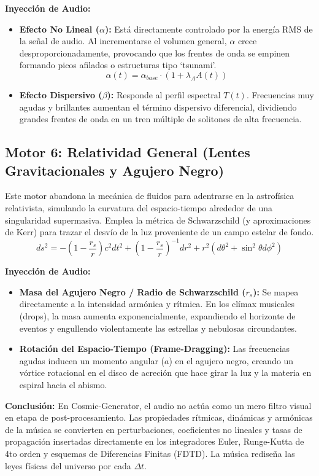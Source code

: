 \documentclass[12pt, openany]{book}
\begin{document}
\textbf{Inyección de Audio:}
\begin{itemize}
    \item \textbf{Efecto No Lineal ($\alpha$):} Está directamente controlado por la energía RMS de la señal de audio. Al incrementarse el volumen general, $\alpha$ crece desproporcionadamente, provocando que los frentes de onda se empinen formando picos afilados o estructuras tipo `tsunami'.
    $$\alpha(t) = \alpha_{base} \cdot (1 + \lambda_A A(t))$$
    \item \textbf{Efecto Dispersivo ($\beta$):} Responde al perfil espectral $T(t)$. Frecuencias muy agudas y brillantes aumentan el término dispersivo diferencial, dividiendo grandes frentes de onda en un tren múltiple de solitones de alta frecuencia.
\end{itemize}

\subsection{Motor 6: Relatividad General (Lentes Gravitacionales y Agujero Negro)}
Este motor abandona la mecánica de fluidos para adentrarse en la astrofísica relativista, simulando la curvatura del espacio-tiempo alrededor de una singularidad supermasiva. Emplea la métrica de Schwarzschild (y aproximaciones de Kerr) para trazar el desvío de la luz proveniente de un campo estelar de fondo.
\begin{equation}
ds^2 = -\left(1-\frac{r_s}{r}\right) c^2 dt^2 + \left(1-\frac{r_s}{r}\right)^{-1} dr^2 + r^2(d\theta^2 + \sin^2\theta d\phi^2)
\end{equation}

\textbf{Inyección de Audio:}
\begin{itemize}
    \item \textbf{Masa del Agujero Negro / Radio de Schwarzschild ($r_s$):} Se mapea directamente a la intensidad armónica y rítmica. En los clímax musicales (drops), la masa aumenta exponencialmente, expandiendo el horizonte de eventos y engullendo violentamente las estrellas y nebulosas circundantes.
    \item \textbf{Rotación del Espacio-Tiempo (Frame-Dragging):} Las frecuencias agudas inducen un momento angular ($a$) en el agujero negro, creando un vórtice rotacional en el disco de acreción que hace girar la luz y la materia en espiral hacia el abismo.
\end{itemize}

\vspace{0.5cm}
\textbf{Conclusión:}
En Cosmic-Generator, el audio no actúa como un mero filtro visual en etapa de post-procesamiento. Las propiedades rítmicas, dinámicas y armónicas de la música se convierten en perturbaciones, coeficientes no lineales y tasas de propagación insertadas directamente en los integradores Euler, Runge-Kutta de 4to orden y esquemas de Diferencias Finitas (FDTD). La música rediseña las leyes físicas del universo por cada $\Delta t$.
\end{document}
